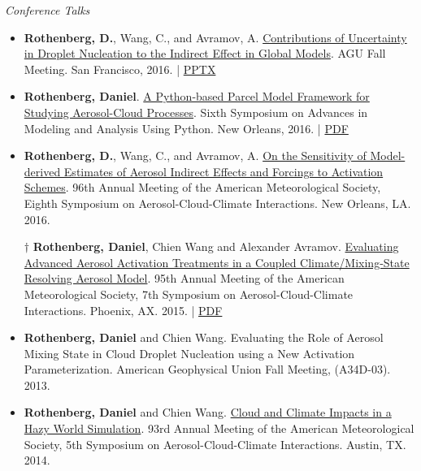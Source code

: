 \documentclass[11pt,letterpaper]{article}
\begin{document}
\bigskip
\emph{Conference Talks}
\medskip
\begin{itemize}[itemindent=-10pt]

 \item \textbf{Rothenberg, D.}, Wang, C., and Avramov, A.
 \href{https://agu.confex.com/agu/fm16/meetingapp.cgi/Paper/193282}{Contributions of Uncertainty in Droplet Nucleation to the Indirect Effect in Global Models}. AGU Fall Meeting. San Francisco, 2016. | \href{https://figshare.com/articles/Contributions_of_Uncertainty_in_Droplet_Nucleation_to_the_Indirect_Effect_in_Global_Models/4503047}{PPTX}

 \item \textbf{Rothenberg, Daniel}. \href{https://ams.confex.com/ams/96Annual/webprogram/Paper286193.html}{A Python-based Parcel Model Framework for Studying Aerosol-Cloud Processes}. Sixth Symposium on Advances in Modeling and Analysis Using Python. New Orleans, 2016. | \href{https://figshare.com/articles/A_Python-based_Parcel_Model_Framework_for_Studying_Aerosol-Cloud_Processes/3475241}{PDF}

 \item \textbf{Rothenberg, D.}, Wang, C., and Avramov, A. \href{https://ams.confex.com/ams/96Annual/webprogram/Paper289914.html}{On the Sensitivity of Model-derived Estimates of Aerosol Indirect Effects and Forcings to Activation Schemes}. 96th Annual Meeting of the American Meteorological Society, Eighth Symposium on Aerosol-Cloud-Climate Interactions. New Orleans, LA. 2016.

 \item[$\dagger$] \textbf{Rothenberg, Daniel}, Chien Wang and Alexander Avramov. \href{https://ams.confex.com/ams/95Annual/webprogram/Paper268747.html}{Evaluating Advanced Aerosol Activation Treatments in a Coupled Climate/Mixing-State Resolving Aerosol Model}. 95th Annual Meeting of the American Meteorological Society, 7th Symposium on Aerosol-Cloud-Climate Interactions. Phoenix, AX. 2015. | \href{https://figshare.com/articles/Evaluating_Advanced_Aerosol_Activation_Treatments_in_a_Coupled_Climate_Mixing-State_Resolving_Aerosol_Model/3475226}{PDF}

 \item \textbf{Rothenberg, Daniel} and Chien Wang. Evaluating the Role of Aerosol Mixing State in Cloud Droplet Nucleation using a New Activation Parameterization. American Geophysical Union Fall Meeting, (A34D-03). 2013.

 \item \textbf{Rothenberg, Daniel} and Chien Wang. \href{http://figshare.com/articles/AMS_2014_Evaluating_the_Role_of_Aerosol_Mixing_State_in_Cloud_Droplet_Nucleation_towards_Developing_a_New_Activation_Parameterization/918655}{Cloud and Climate Impacts in a Hazy World Simulation}. 93rd Annual Meeting of the American Meteorological Society, 5th Symposium on Aerosol-Cloud-Climate Interactions. Austin, TX. 2014.


\end{itemize}
\end{document}
